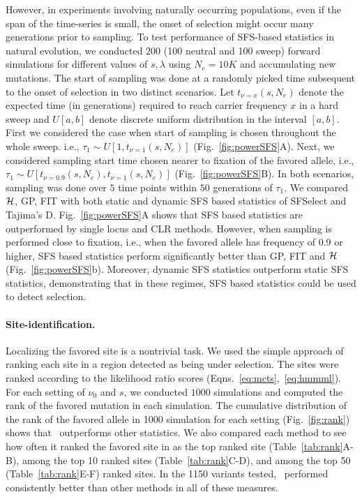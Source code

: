 However, in experiments involving naturally occurring populations,
even if the span of the time-series is small, the onset of selection
might occur many generations prior to sampling. To test performance of
SFS-based statistics in natural evolution, we conducted 200 (100
neutral and 100 sweep) forward simulations for different values of
$s,\lambda$ using $N_e=10K$ and accumulating new mutations. The start
of sampling was done at a randomly picked time subsequent to the onset
of selection in two distinct scenarios. Let $t_{\nu=x}(s,N_e)$ denote
the expected time (in generations) required to reach carrier frequency
$x$ in a hard sweep and $U[a,b]$ denote discrete uniform distribution
in the interval $[a,b]$. First we considered the case when start of
sampling is chosen throughout the whole sweep. i.e., $\tau_1 \sim
U\left[1,t_{\nu=1}(s,N_e)\right]$ (Fig.~\ref{fig:powerSFS}A). Next, we
considered sampling start time chosen nearer to fixation of the
favored allele, i.e., $\tau_1 \sim
U\left[t_{\nu=0.9}(s,N_e),t_{\nu=1}(s,N_e)\right]$
(Fig.~\ref{fig:powerSFS}B). In both scenarios, sampling was done over
$5$ time points within $50$ generations of $\tau_1$. We compared
${\cal H}$, GP, FIT with both static and dynamic SFS based statistics of
SFSelect and Tajima's D. Fig.~\ref{fig:powerSFS}A shows that SFS based
statistics are outperformed by single locus and CLR methods. However,
when sampling is performed close to fixation, i.e., when the favored
allele has frequency of 0.9 or higher, SFS based statistics perform
significantly better than GP, FIT and ${\cal H}$
(Fig.~\ref{fig:powerSFS}b). Moreover, dynamic SFS statistics
outperform static SFS statistics, demonstrating that in these regimes,
SFS based statistics could be used to detect selection.


\paragraph{Site-identification.}
Localizing the favored site is a nontrivial task. We used the simple
approach of ranking each site in a region detected as being under
selection. The sites were ranked according to the likelihood ratio
scores (Eqns.~\ref{eq:mcts},~\ref{eq:hmmml}). For each setting of
$\nu_0$ and $s$, we conducted $1000$ simulations and computed the rank
of the favored mutation in each simulation. The cumulative
distribution of the rank of the favored allele in 1000 simulation for
each setting (Fig.~\ref{fig:rank}) shows that \comale\ outperforms
other statistics. We also compared each method to see how often it
ranked the favored site in as the top ranked site
(Table~\ref{tab:rank}A-B), among the top 10 ranked sites
(Table~\ref{tab:rank}C-D), and among the top 50
(Table~\ref{tab:rank}E-F) ranked sites. In the 1150 variants tested,
\comale\ performed consistently better than other methods in all of
these measures.

